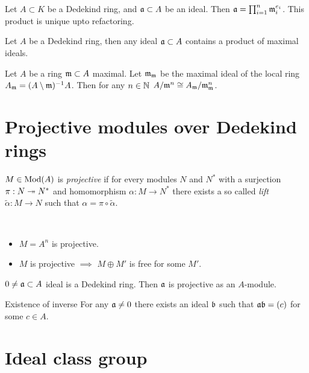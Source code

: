 \documentclass[12pt, a4paper]{article}
\begin{document}
	\begin{thm}{}{}
		Let $A \subset K$ be a Dedekind ring, and $\aa \subset A$ be an ideal.	
		Then $\aa = \prod_{i=1}^{n} \mm_i^{e_i}$. This product is unique upto refactoring.
	\end{thm}

	\begin{Lemma}{}{}
		Let $A$ be a Dedekind ring, then any ideal $\aa \subset A$ contains a product 
		of maximal ideals.
	\end{Lemma}

	\begin{Lemma}{}{}
		Let $A$ be a ring $\mm \subset A$ maximal. Let $\mm_\mm$ be the maximal ideal 
		of the local ring $A_\mm = (A \ohne \mm)^{-1}A$.
		Then for any $n \in \N$ 
		$A/\mm^n \cong A_\mm/\mm_\mm^n$.
	\end{Lemma}

	\section{Projective modules over Dedekind rings}

	\begin{Def}{}{}
		$M \in \Mod(A)$	is \emph{projective} if for every modules $N$ and $N^*$ 
		with a surjection $\pi: N \epim N^*$ and homomorphism $\alpha: M \to N^*$ there 
		exists a so called \emph{lift} $\tilde{\alpha}: M \to N$ such that 
		$\alpha = \pi \circ \tilde\alpha$.
	\end{Def}

	\begin{ex} \
		\begin{itemize}
			\item $M = A^n$ is projective.
			\item $M$ is projective $\implies$ $M \oplus M'$ is free for some $M'$.
		\end{itemize}	
	\end{ex}

	\begin{cor}{}{}
		$0 \neq \aa \subset A$ ideal is a Dedekind ring. Then $\aa$ is projective 
		as an $A$-module.
	\end{cor}

	\begin{cor}{Existence of inverse}{}
		For any $\aa \neq 0$ there exists an ideal $\bb$ such that $\aa \bb = (c)$ for 
		some $c \in A$.
	\end{cor} 

	\section{Ideal class group}
\end{document}
